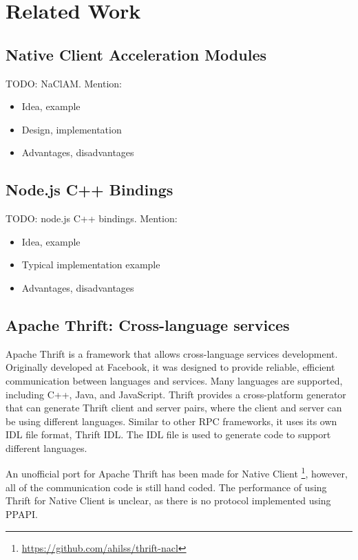 \chapter{Related Work} 
\label{Chapter3} 

\section{Native Client Acceleration Modules} %
\label{sec:naclam}

TODO: NaClAM. Mention:
\begin{itemize}
	\item Idea, example
	\item Design, implementation
	\item Advantages, disadvantages
\end{itemize}


\section{Node.js C++ Bindings} %
\label{sec:node_js_c_bindings}
TODO: node.js C++ bindings. Mention:
\begin{itemize}
	\item Idea, example
	\item Typical implementation example
	\item Advantages, disadvantages
\end{itemize}



\section{Apache Thrift: Cross-language services} %
\label{sec:apache_thrift_cross_language_services}
Apache Thrift is a framework that allows cross-language services development. Originally developed at Facebook, it was designed to provide reliable, efficient communication between languages and services. Many languages are supported, including C++, Java, and JavaScript. Thrift provides a cross-platform generator that can generate Thrift client and server pairs, where the client and server can be using different languages. Similar to other RPC frameworks, it uses its own IDL file format, Thrift IDL. The IDL file is used to generate code to support different languages.

An unofficial port for Apache Thrift has been made for Native Client \footnote{\url{https://github.com/ahilss/thrift-nacl}}, however, all of the communication code is still hand coded. The performance of using Thrift for Native Client is unclear, as there is no protocol implemented using PPAPI.

